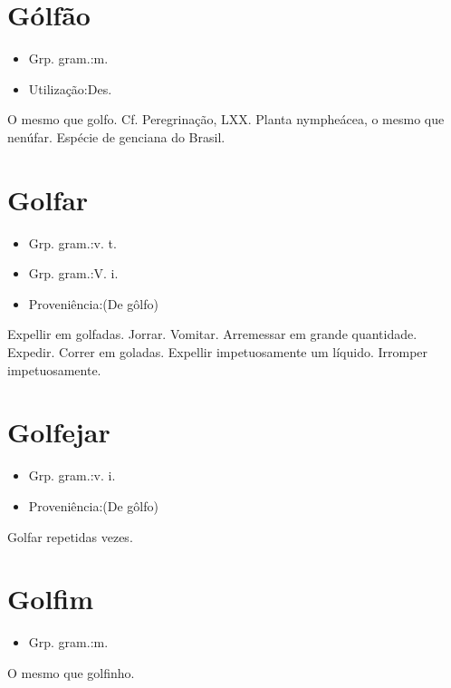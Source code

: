 \section{Gólfão}
\begin{itemize}
\item {Grp. gram.:m.}
\end{itemize}
\begin{itemize}
\item {Utilização:Des.}
\end{itemize}
O mesmo que \textunderscore golfo\textunderscore . Cf. \textunderscore Peregrinação\textunderscore , LXX.
Planta nympheácea, o mesmo que \textunderscore nenúfar\textunderscore .
Espécie de genciana do Brasil.
\section{Golfar}
\begin{itemize}
\item {Grp. gram.:v. t.}
\end{itemize}
\begin{itemize}
\item {Grp. gram.:V. i.}
\end{itemize}
\begin{itemize}
\item {Proveniência:(De \textunderscore gôlfo\textunderscore )}
\end{itemize}
Expellir em golfadas.
Jorrar.
Vomitar.
Arremessar em grande quantidade.
Expedir.
Correr em goladas.
Expellir impetuosamente um líquido.
Irromper impetuosamente.
\section{Golfejar}
\begin{itemize}
\item {Grp. gram.:v. i.}
\end{itemize}
\begin{itemize}
\item {Proveniência:(De \textunderscore gôlfo\textunderscore )}
\end{itemize}
Golfar repetidas vezes.
\section{Golfim}
\begin{itemize}
\item {Grp. gram.:m.}
\end{itemize}
O mesmo que \textunderscore golfinho\textunderscore .
